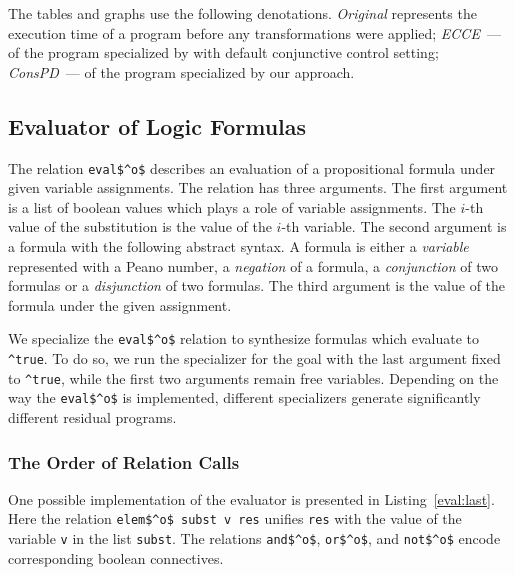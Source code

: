 The tables and graphs use the following denotations.
\emph{Original} represents the execution time of a program before any transformations were applied; \emph{ECCE}~--- of the program specialized by \ecce with default conjunctive control setting; \emph{ConsPD}~--- of the program specialized by our approach.

\subsection{Evaluator of Logic Formulas}

The relation \lstinline{eval$^o$} describes an evaluation of a propositional formula under given variable assignments.
The relation has three arguments. The first argument is a list of boolean values which plays a role of variable assignments.
The $i$-th value of the substitution is the value of the $i$-th variable.
The second argument is a formula with the following abstract syntax.
A formula is either a \emph{variable} represented with a Peano number, a \emph{negation} of a formula, a \emph{conjunction} of two formulas or a \emph{disjunction} of two formulas.
The third argument is the value of the formula under the given assignment.

We specialize the \lstinline{eval$^o$} relation to synthesize formulas which evaluate to \lstinline{^true}.
To do so, we run the specializer for the goal with the last argument fixed to \lstinline{^true}, while the first two arguments remain free variables.
Depending on the way the \lstinline{eval$^o$} is implemented, different specializers generate significantly different residual programs.

\subsubsection{The Order of Relation Calls}

One possible implementation of the evaluator is presented in Listing~\ref{eval:last}.
Here the relation \lstinline{elem$^o$ subst v res} unifies \lstinline{res} with the value of the variable \lstinline{v} in the list \lstinline{subst}.
The relations \lstinline{and$^o$}, \lstinline{or$^o$}, and \lstinline{not$^o$} encode corresponding boolean connectives.

